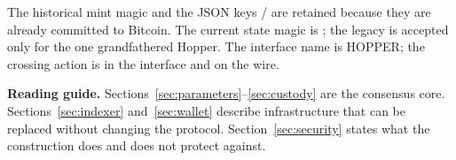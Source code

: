 \vspace{6mm}
{\small\color{muted}\noindent
The historical mint magic  and the JSON keys
/ are retained because they are already committed to
Bitcoin. The current state magic is ; the legacy
 is accepted only for the one grandfathered Hopper. The
interface name is \textsf{HOPPER}; the crossing action is  in the
interface and  on the wire.}

\clearpage

\thispagestyle{plain}
\renewcommand{\contentsname}{\sffamily\color{deepgreen}Contents}
\tableofcontents
\vfill
\begin{notebox}
\small
\textbf{Reading guide.} Sections~\ref{sec:parameters}--\ref{sec:custody}
are the consensus core. Sections~\ref{sec:indexer} and~\ref{sec:wallet}
describe infrastructure that can be replaced without changing the protocol.
Section~\ref{sec:security} states what the construction does and does not
protect against.
\end{notebox}
\clearpage
